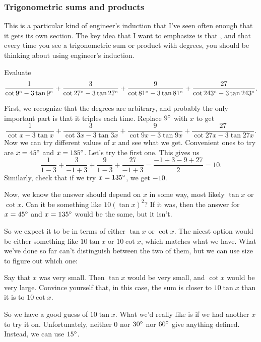 \documentclass[11pt,paper=letter]{scrartcl}
\begin{document}
\subsubsection{Trigonometric sums and products}

This is a particular kind of engineer's induction that I've seen often enough that it gets its own section. The key idea that I want to emphasize is that , and that every time you see a trigonometric sum or product with degrees, you should be thinking about using engineer's induction.

\begin{exboxed}[Titu]
  Evaluate
  \[
  \frac{1}{\cot 9^\circ - 3 \tan 9^\circ} + \frac{3}{\cot 27^\circ - 3\tan 27^\circ} + \frac{9}{\cot 81^\circ - 3 \tan 81^\circ} + \frac{27}{\cot 243^\circ - 3\tan 243^\circ}.
  \]
\end{exboxed}

First, we recognize that the degrees are arbitrary, and probably the only important part is that it triples each time. Replace $9^\circ$ with $x$ to get
\[
\frac{1}{\cot x - 3 \tan x} + \frac{3}{\cot 3x - 3\tan 3x} + \frac{9}{\cot 9x - 3 \tan 9x} + \frac{27}{\cot 27x - 3\tan 27x}.
\]
Now we can try different values of $x$ and see what we get. Convenient ones to try are $x = 45^\circ$ and $x = 135^\circ$. Let's try the first one. This gives us
\[
\frac{1}{1 - 3} + \frac{3}{-1 + 3} + \frac{9}{1 - 3} + \frac{27}{-1 + 3} = \frac{-1 + 3 - 9 + 27}{2} = 10.
\]
Similarly, check that if we try $x = 135^\circ$, we get $-10$.

Now, we know the answer should depend on $x$ in some way, most likely $\tan x$ or $\cot x$. Can it be something like $10\left(\tan x\right)^2$? If it was, then the answer for $x = 45^\circ$ and $x = 135^\circ$ would be the same, but it isn't.

So we expect it to be in terms of either $\tan x$ or $\cot x$. The nicest option would be either something like $10 \tan x$ or $10 \cot x$, which matches what we have. What we've done so far can't distinguish between the two of them, but we can use size to figure out which one:

\begin{exrboxed}
  Say that $x$ was very small. Then $\tan x$ would be very small, and $\cot x$ would be very large. Convince yourself that, in this case, the sum is closer to $10 \tan x$ than it is to $10 \cot x$.
\end{exrboxed}

So we have a good guess of $10 \tan x$. What we'd really like is if we had another $x$ to try it on. Unfortunately, neither $0$ nor $30^\circ$ nor $60^\circ$ give anything defined. Instead, we can use $15^\circ$.
\end{document}
